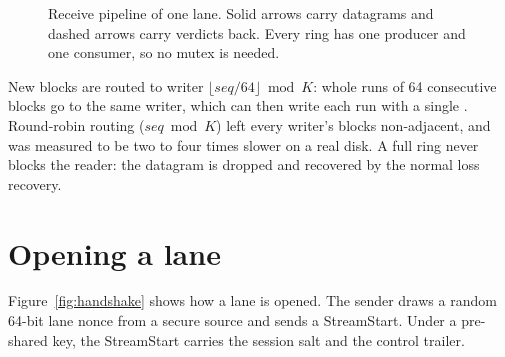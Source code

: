 \begin{figure}[H]
\centering
{}
\caption{Receive pipeline of one lane. Solid arrows carry datagrams and dashed arrows carry verdicts back.
Every ring has one producer and one consumer, so no mutex is needed.}\label{fig:pipeline}
\end{figure}

New blocks are routed to writer $\lfloor \mathit{seq}/64\rfloor \bmod K$: whole runs of 64 consecutive blocks go
to the same writer, which can then write each run with a single . Round-robin routing
($\mathit{seq}\bmod K$) left every writer's blocks non-adjacent, and was measured to be two to four times slower
on a real disk. A full ring never blocks the reader: the datagram is dropped and recovered by the normal loss
recovery.

\section{Opening a lane}\label{sec:handshake}

Figure~\ref{fig:handshake} shows how a lane is opened. The sender draws a random 64-bit lane nonce from a
secure source and sends a StreamStart. Under a pre-shared key, the StreamStart carries the session salt and the
control trailer.

